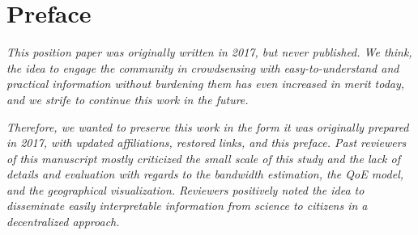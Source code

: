 \section*{Preface}


\textit{This position paper was originally written in 2017, but never published. We think, the idea to engage the community in crowdsensing with easy-to-understand and practical information without burdening them has even increased in merit today, and we strife to continue this work in the future.} 

\textit{Therefore, we wanted to preserve this work in the form it was originally prepared in 2017, with updated affiliations, restored links, and this preface. Past reviewers of this manuscript mostly criticized the small scale of this study and the lack of details and evaluation with regards to the bandwidth estimation, the QoE model, and the geographical visualization. Reviewers positively noted the idea to disseminate easily interpretable information from science to citizens in a decentralized approach.}
